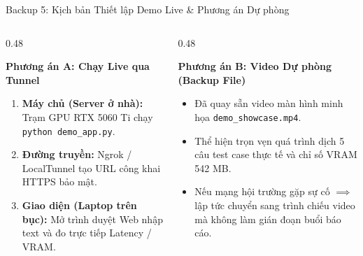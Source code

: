 \documentclass[aspectratio=169, 10pt]{beamer}
\begin{document}
\begin{frame}{Backup 5: Kịch bản Thiết lập Demo Live \& Phương án Dự phòng}
  \begin{columns}
    \begin{column}{0.48\textwidth}
      \begin{block}{\textbf{Phương án A: Chạy Live qua Tunnel}}
        \begin{enumerate}
          \item \textbf{Máy chủ (Server ở nhà):} Trạm GPU RTX 5060 Ti chạy \texttt{python demo\_app.py}.
          \item \textbf{Đường truyền:} Ngrok / LocalTunnel tạo URL công khai HTTPS bảo mật.
          \item \textbf{Giao diện (Laptop trên bục):} Mở trình duyệt Web nhập text và đo trực tiếp Latency / VRAM.
        \end{enumerate}
      \end{block}
    \end{column}
    \begin{column}{0.48\textwidth}
      \begin{alertblock}{\textbf{Phương án B: Video Dự phòng (Backup File)}}
        \begin{itemize}
          \item Đã quay sẵn video màn hình minh họa \texttt{demo\_showcase.mp4}.
          \item Thể hiện trọn vẹn quá trình dịch 5 câu test case thực tế và chỉ số VRAM 542 MB.
          \item Nếu mạng hội trường gặp sự cố $\implies$ lập tức chuyển sang trình chiếu video mà không làm gián đoạn buổi báo cáo.
        \end{itemize}
      \end{alertblock}
    \end{column}
  \end{columns}
\end{frame}
\end{document}

